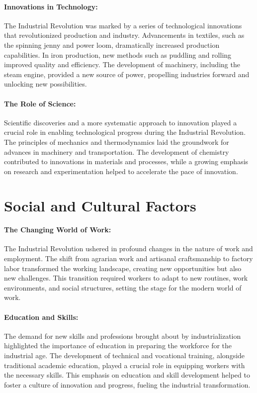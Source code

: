 \documentclass[a4paper,12pt]{book}
\begin{document}
\paragraph{Innovations in Technology:}
The Industrial Revolution was marked by a series of technological innovations that revolutionized production and industry. Advancements in textiles, such as the spinning jenny and power loom, dramatically increased production capabilities. In iron production, new methods such as puddling and rolling improved quality and efficiency. The development of machinery, including the steam engine, provided a new source of power, propelling industries forward and unlocking new possibilities.

\paragraph{The Role of Science:}
Scientific discoveries and a more systematic approach to innovation played a crucial role in enabling technological progress during the Industrial Revolution. The principles of mechanics and thermodynamics laid the groundwork for advances in machinery and transportation. The development of chemistry contributed to innovations in materials and processes, while a growing emphasis on research and experimentation helped to accelerate the pace of innovation.

\section*{Social and Cultural Factors}

\paragraph{The Changing World of Work:}
The Industrial Revolution ushered in profound changes in the nature of work and employment. The shift from agrarian work and artisanal craftsmanship to factory labor transformed the working landscape, creating new opportunities but also new challenges. This transition required workers to adapt to new routines, work environments, and social structures, setting the stage for the modern world of work.

\paragraph{Education and Skills:}
The demand for new skills and professions brought about by industrialization highlighted the importance of education in preparing the workforce for the industrial age. The development of technical and vocational training, alongside traditional academic education, played a crucial role in equipping workers with the necessary skills. This emphasis on education and skill development helped to foster a culture of innovation and progress, fueling the industrial transformation.
\end{document}
